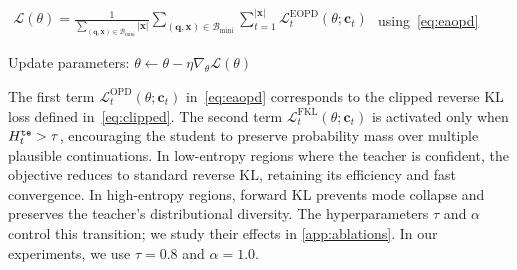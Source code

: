 \begin{algorithm}[!t]
\begin{algorithmic}[1]
        \STATE
        $\begin{aligned}
        \mathcal{L}(\theta)
        =
        \frac{1}{\sum_{(\mathbf{q},\mathbf{x}) \in \mathcal{B}_{\text{mini}}} |\mathbf{x}|}
        \sum_{(\mathbf{q},\mathbf{x}) \in \mathcal{B}_{\text{mini}}}
        \sum_{t=1}^{|\mathbf{x}|}
        \mathcal{L}^{\text{EOPD}}_t(\theta;\mathbf{c}_t)
        \end{aligned}$ using~\eqref{eq:eaopd}
        
        \STATE Update parameters:
        $\theta \leftarrow \theta - \eta \nabla_\theta \mathcal{L}(\theta)$
    \ENDFOR
\ENDFOR
\end{algorithmic}
\end{algorithm}

The first term $\mathcal{L}^{\text{OPD}}_t (\theta;\mathbf{c}_t)$ in~\eqref{eq:eaopd} corresponds to the clipped reverse KL loss defined in~\eqref{eq:clipped}. The second term $\mathcal{L}^{\text{FKL}}_t (\theta;\mathbf{c}_t)$ is activated only when $H_t^{{\tt te}} > \tau$, encouraging the student to preserve probability mass over multiple plausible continuations. In low-entropy regions where the teacher is confident, the objective reduces to standard reverse KL, retaining its efficiency and fast convergence. In high-entropy regions, forward KL prevents mode collapse and preserves the teacher's distributional diversity. The hyperparameters $\tau$ and $\alpha$ control this transition; we study their effects in \autoref{app:ablations}. In our experiments, we use $\tau = 0.8$ and $\alpha = 1.0$.

